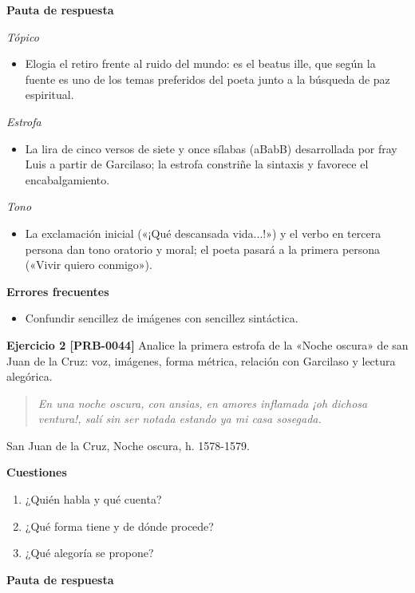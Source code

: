 \documentclass{book}
\begin{document}
\noindent\textbf{Pauta de respuesta}

\noindent\textit{Tópico}
\begin{itemize}
\item Elogia el retiro frente al ruido del mundo: es el beatus ille, que según la fuente es uno de los temas preferidos del poeta junto a la búsqueda de paz espiritual.
\end{itemize}

\noindent\textit{Estrofa}
\begin{itemize}
\item La lira de cinco versos de siete y once sílabas (aBabB) desarrollada por fray Luis a partir de Garcilaso; la estrofa constriñe la sintaxis y favorece el encabalgamiento.
\end{itemize}

\noindent\textit{Tono}
\begin{itemize}
\item La exclamación inicial («¡Qué descansada vida...!») y el verbo en tercera persona dan tono oratorio y moral; el poeta pasará a la primera persona («Vivir quiero conmigo»).
\end{itemize}

\noindent\textbf{Errores frecuentes}
\begin{itemize}
\item Confundir sencillez de imágenes con sencillez sintáctica.
\end{itemize}

\noindent\textbf{Ejercicio 2 [PRB-0044]}
Analice la primera estrofa de la «Noche oscura» de san Juan de la Cruz: voz, imágenes, forma métrica, relación con Garcilaso y lectura alegórica.


\begin{quote}
\itshape En una noche oscura, con ansias, en amores inflamada ¡oh dichosa ventura!, salí sin ser notada estando ya mi casa sosegada.
\end{quote}
{\noindent\footnotesize San Juan de la Cruz, Noche oscura, h. 1578-1579.\par}

\noindent\textbf{Cuestiones}
\begin{enumerate}
\item ¿Quién habla y qué cuenta?
\item ¿Qué forma tiene y de dónde procede?
\item ¿Qué alegoría se propone?
\end{enumerate}

\noindent\textbf{Pauta de respuesta}
\end{document}
